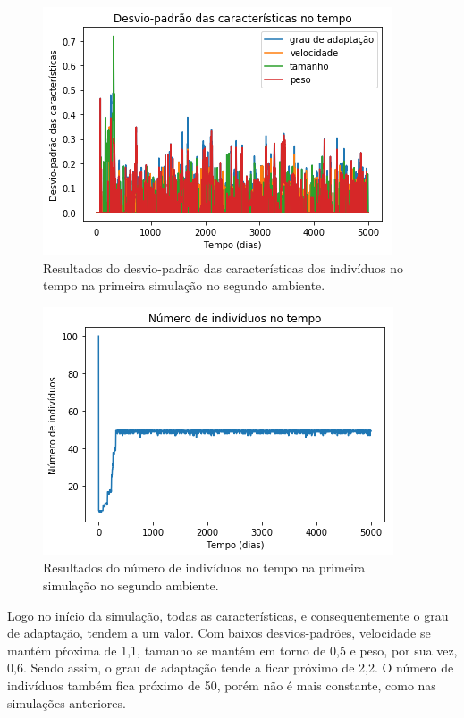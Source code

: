 \documentclass[10pt,brazil,english]{article}
\begin{document}
        \begin{figure}[!hbtp]
            \begin{center}
                \includegraphics[scale=0.5]{Images/2-2.png}
            \end{center}
            \caption{Resultados do desvio-padrão das características dos indivíduos no tempo na primeira simulação no segundo ambiente.}
            \label{Fig8}
        \end{figure} 
        
        \begin{figure}[!hbtp]
            \begin{center}
                \includegraphics[scale=0.5]{Images/2-3.png}
            \end{center}
            \caption{Resultados do número de indivíduos no tempo na primeira simulação no segundo ambiente.}
            \label{Fig9}
        \end{figure}
        
        Logo no início da simulação, todas as características, e consequentemente o grau de adaptação, tendem a um valor. Com baixos desvios-padrões, velocidade se mantém pŕoxima de 1,1, tamanho se mantém em torno de 0,5 e peso, por sua vez, 0,6. Sendo assim, o grau de adaptação tende a ficar próximo de 2,2. O número de indivíduos também fica próximo de 50, porém não é mais constante, como nas simulações anteriores.
        
\end{document}
